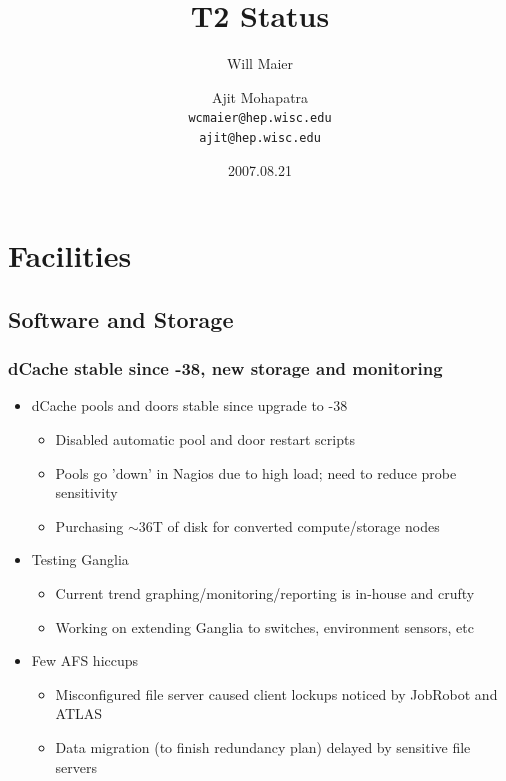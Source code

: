 \documentclass{beamer}
\title{T2 Status}
\author[Maier, Mohapatra]{
    Will Maier \and Ajit Mohapatra\\ 
    {\tt wcmaier@hep.wisc.edu}\\
    {\tt ajit@hep.wisc.edu}}
\institute[Wisconsin]{University of Wisconsin - High Energy Physics}
\date{2007.08.21}
\newcommand{\ca}{\ensuremath{\sim}}
\begin{document}
\begin{frame}
    \titlepage
\end{frame}



\section{Facilities}
\subsection{Software and Storage}
\begin{frame}
\frametitle{dCache stable since -38, new storage and monitoring}
\begin{itemize}
    \item dCache pools and doors stable since upgrade to -38
    \begin{itemize}
        \item Disabled automatic pool and door restart scripts
        \item Pools go 'down' in Nagios due to high load; need to reduce probe sensitivity
        \item Purchasing \ca{}36T of disk for converted compute/storage nodes
    \end{itemize}
    \item Testing Ganglia
    \begin{itemize}
        \item Current trend graphing/monitoring/reporting is in-house and crufty
        \item Working on extending Ganglia to switches, environment sensors, etc
    \end{itemize}
    \item Few AFS hiccups
    \begin{itemize}
        \item Misconfigured file server caused client lockups noticed by JobRobot and ATLAS
        \item Data migration (to finish redundancy plan) delayed by sensitive file servers
    \end{itemize}
\end{itemize}
\end{frame}
\end{document}
